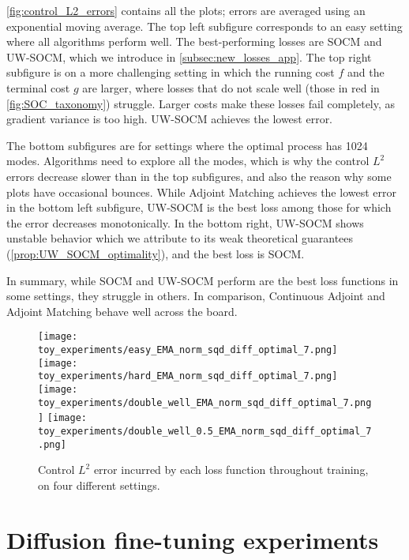 \documentclass[]{fairmeta}
\begin{document}
\autoref{fig:control_L2_errors} contains all the plots; errors are averaged using an exponential moving average. The top left subfigure corresponds to an easy setting where all algorithms perform well. The best-performing losses are SOCM and UW-SOCM, which we introduce in \autoref{subsec:new_losses_app}. The top right subfigure is on a more challenging setting in which the running cost $f$ and the terminal cost $g$ are larger, where losses that do not scale well (those in red in \autoref{fig:SOC_taxonomy}) struggle. Larger costs make these losses fail completely, as gradient variance is too high. UW-SOCM achieves the lowest error. 

The bottom subfigures are for settings where the optimal process has 1024 modes. Algorithms need to explore all the modes, which is why the control $L^2$ errors decrease slower than in the top subfigures, and also the reason why some plots have occasional bounces. While Adjoint Matching achieves the lowest error in the bottom left subfigure, UW-SOCM is the best loss among those for which the error decreases monotonically. In the bottom right, UW-SOCM shows unstable behavior which we attribute to its weak theoretical guarantees (\autoref{prop:UW_SOCM_optimality}), and the best loss is SOCM.

In summary, while SOCM and UW-SOCM perform are the best loss functions in some settings, they struggle in others. In comparison, Continuous Adjoint and Adjoint Matching behave well across the board. 

\begin{figure}[H]
    \centering
    \texttt{[image: toy\_experiments/easy\_EMA\_norm\_sqd\_diff\_optimal\_7.png]}
    \texttt{[image: toy\_experiments/hard\_EMA\_norm\_sqd\_diff\_optimal\_7.png]}
    \texttt{[image: toy\_experiments/double\_well\_EMA\_norm\_sqd\_diff\_optimal\_7.png]}
    \texttt{[image: toy\_experiments/double\_well\_0.5\_EMA\_norm\_sqd\_diff\_optimal\_7.png]}
    \caption{Control $L^2$ error incurred by each loss function throughout training, on four different settings.}
    \label{fig:control_L2_errors}
\end{figure}

\section{Diffusion fine-tuning experiments} \label{sec:diff_finetuning_exp}
\end{document}

